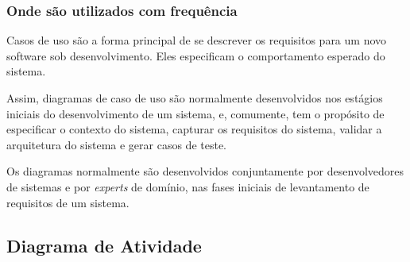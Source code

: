 \subsubsection{Onde são utilizados com frequência}

Casos de uso são a forma principal de se descrever os requisitos para um novo software sob desenvolvimento. Eles especificam o comportamento esperado do sistema.

Assim, diagramas de caso de uso são normalmente desenvolvidos nos estágios iniciais do desenvolvimento de um sistema, e, comumente, tem o propósito de especificar o contexto do sistema, capturar os requisitos do sistema, validar a arquitetura do sistema e gerar casos de teste.

Os diagramas normalmente são desenvolvidos conjuntamente por desenvolvedores de sistemas e por \textit{experts} de domínio, nas fases iniciais de levantamento de requisitos de um sistema. 

\subsection{Diagrama de Atividade}
